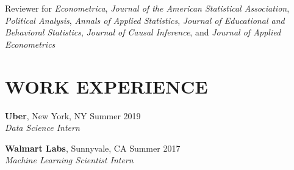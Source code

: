 \documentclass{res}
\begin{document}
\begin{resume}
\vskip -8pt
\hspace{0.2em} Reviewer for {\it Econometrica}, {\it Journal of the American Statistical Association}, {\it Political Analysis}, {\it Annals of Applied Statistics}, {\it Journal of Educational and Behavioral Statistics}, {\it Journal of Causal Inference}, and {\it Journal of Applied Econometrics}


\section{WORK EXPERIENCE}
\medskip
\textbf{Uber}, New York, NY \hfill{Summer 2019}\\
\textit{Data Science Intern}
\vspace{-2mm}  

\textbf{Walmart Labs}, Sunnyvale, CA \hfill{Summer 2017}\\
\textit{Machine Learning Scientist Intern}


\end{resume}
\end{document}
